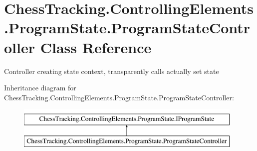 \hypertarget{class_chess_tracking_1_1_controlling_elements_1_1_program_state_1_1_program_state_controller}{}\section{Chess\+Tracking.\+Controlling\+Elements.\+Program\+State.\+Program\+State\+Controller Class Reference}
\label{class_chess_tracking_1_1_controlling_elements_1_1_program_state_1_1_program_state_controller}


Controller creating state context, transparently calls actually set state  


Inheritance diagram for Chess\+Tracking.\+Controlling\+Elements.\+Program\+State.\+Program\+State\+Controller\+:\begin{figure}[H]
\begin{center}
\leavevmode
\includegraphics[height=2.000000cm]{class_chess_tracking_1_1_controlling_elements_1_1_program_state_1_1_program_state_controller}
\end{center}
\end{figure}
